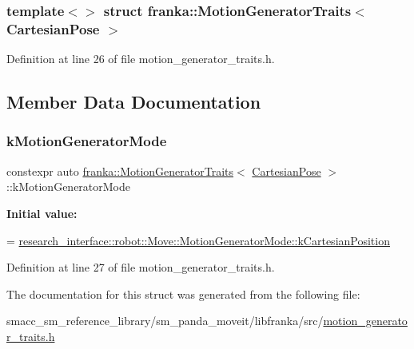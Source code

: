 \subsubsection*{template$<$$>$\newline
struct franka\+::\+Motion\+Generator\+Traits$<$ Cartesian\+Pose $>$}



Definition at line 26 of file motion\+\_\+generator\+\_\+traits.\+h.



\subsection{Member Data Documentation}
\mbox{\label{structfranka_1_1MotionGeneratorTraits_3_01CartesianPose_01_4_ac5a56c6949bc012eac822ce92a03213e}} 
\subsubsection{\texorpdfstring{k\+Motion\+Generator\+Mode}{kMotionGeneratorMode}}
{\footnotesize\ttfamily constexpr auto \hyperlink{structfranka_1_1MotionGeneratorTraits}{franka\+::\+Motion\+Generator\+Traits}$<$ \hyperlink{classfranka_1_1CartesianPose}{Cartesian\+Pose} $>$\+::k\+Motion\+Generator\+Mode\hspace{0.3cm}{\ttfamily [static]}}

{\bfseries Initial value\+:}
\begin{DoxyCode}
=
      \hyperlink{structresearch__interface_1_1robot_1_1Move_a334b8380507154e8042b57fbd3287c0fad05aa68e21654f0d7f3672e6827366b6}{research\_interface::robot::Move::MotionGeneratorMode::kCartesianPosition}
\end{DoxyCode}


Definition at line 27 of file motion\+\_\+generator\+\_\+traits.\+h.



The documentation for this struct was generated from the following file\+:\begin{DoxyCompactItemize}
\item 
smacc\+\_\+sm\+\_\+reference\+\_\+library/sm\+\_\+panda\+\_\+moveit/libfranka/src/\hyperlink{motion__generator__traits_8h}{motion\+\_\+generator\+\_\+traits.\+h}\end{DoxyCompactItemize}
